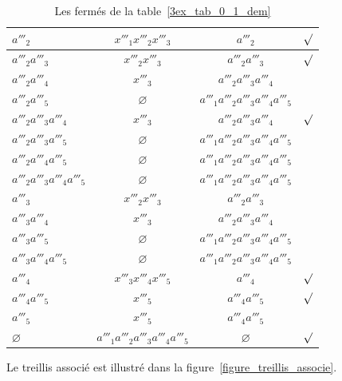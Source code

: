 \documentclass[a4paper]{report}
\renewcommand{\textbf}[1]{\begingroup\bfseries\mathversion{bold}#1\endgroup}
\begin{document}
\begin{table}[htb]
\begin{tabular}{l|c|c|c}
\hline
\textbf{$a'''_2$} & \textbf{$x'''_1x'''_2x'''_3$} & $a'''_2$ & $\surd$\\
\hline
\textbf{$a'''_2a'''_3$} & \textbf{$x'''_2x'''_3$} & $a'''_2a'''_3$ & $\surd$\\
\hline
$a'''_2a'''_4$ & $x'''_3$ & $a'''_2a'''_3a'''_4$ & \\
\hline
$a'''_2a'''_5$ & $\varnothing$ & $a'''_1a'''_2a'''_3a'''_4a'''_5$ & \\
\hline
\textbf{$a'''_2a'''_3a'''_4$} & \textbf{$x'''_3$} & $a'''_2a'''_3a'''_4$ & $\surd$\\
\hline
$a'''_2a'''_3a'''_5$ & $\varnothing$ & $a'''_1a'''_2a'''_3a'''_4a'''_5$ & \\
\hline
$a'''_2a'''_4a'''_5$ & $\varnothing$ & $a'''_1a'''_2a'''_3a'''_4a'''_5$ & \\
\hline
$a'''_2a'''_3a'''_4a'''_5$ & $\varnothing$ & $a'''_1a'''_2a'''_3a'''_4a'''_5$ & \\
\hline
$a'''_3$ & $x'''_2x'''_3$ & $a'''_2a'''_3$ & \\
\hline
$a'''_3a'''_4$ & $x'''_3$ & $a'''_2a'''_3a'''_4$ & \\
\hline
$a'''_3a'''_5$ & $\varnothing$ & $a'''_1a'''_2a'''_3a'''_4a'''_5$ & \\
\hline
$a'''_3a'''_4a'''_5$ & $\varnothing$ & $a'''_1a'''_2a'''_3a'''_4a'''_5$ & \\
\hline
\textbf{$a'''_4$} & \textbf{$x'''_3x'''_4x'''_5$} & $a'''_4$ & $\surd$\\
\hline
\textbf{$a'''_4a'''_5$} & \textbf{$x'''_5$} & $a'''_4a'''_5$ & $\surd$\\
\hline
$a'''_5$ & $x'''_5$ & $a'''_4a'''_5$ & \\
\hline
\textbf{$\varnothing$} & \textbf{$a'''_1a'''_2a'''_3a'''_4a'''_5$} & $\varnothing$ & $\surd$

\end{tabular}

\caption{Les fermés de la table~\ref{3ex_tab_0_1_dem}}
\label{tablefer}
\end{table}
Le treillis associé est illustré dans la figure~\ref{figure_treillis_associe}.
\end{document}
